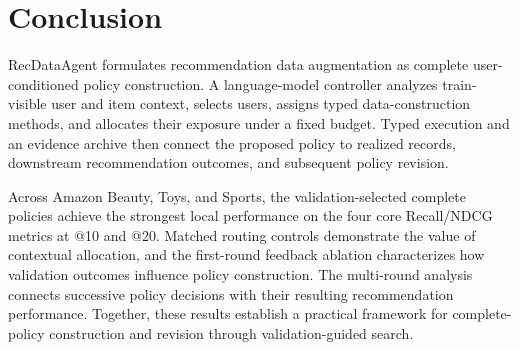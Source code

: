 \section{Conclusion}
\label{sec:conclusion}

RecDataAgent formulates recommendation data augmentation as complete user-conditioned policy construction. A language-model controller analyzes train-visible user and item context, selects users, assigns typed data-construction methods, and allocates their exposure under a fixed budget. Typed execution and an evidence archive then connect the proposed policy to realized records, downstream recommendation outcomes, and subsequent policy revision.

Across Amazon Beauty, Toys, and Sports, the validation-selected complete policies achieve the strongest local performance on the four core Recall/NDCG metrics at @10 and @20. Matched routing controls demonstrate the value of contextual allocation, and the first-round feedback ablation characterizes how validation outcomes influence policy construction. The multi-round analysis connects successive policy decisions with their resulting recommendation performance. Together, these results establish a practical framework for complete-policy construction and revision through validation-guided search.
